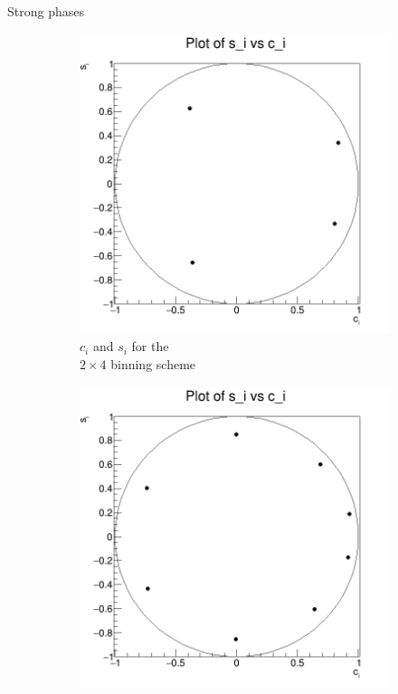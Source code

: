 \documentclass{beamer}
\begin{document}
\begin{frame}{Strong phases}
  \begin{figure}
    \centering
    \vspace{-0.2cm}
    \begin{subfigure}{0.5\textwidth}
      \includegraphics[width = 1.0\textwidth]{Plots/Amplitude_4bins_VariableBins_1p20923_50M_sample1_cs.png}
      \caption{$c_i$ and $s_i$ for the \\$2\times 4$ binning scheme}
    \end{subfigure}%
    \begin{subfigure}{0.5\textwidth}
      \includegraphics[width = 1.0\textwidth]{Plots/Amplitude_8bins_VariableBins_0p645101_1p72065_2p09644_50M_sample1_cs.png}

\end{subfigure}
\end{figure}
\end{frame}
\end{document}
